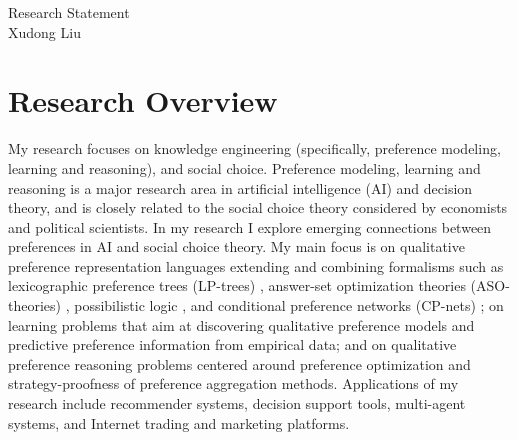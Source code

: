 \documentclass[11pt]{article}
\begin{document}
%

\begingroup  
  \centering
  \huge Research Statement\\[0.25em]
  \large Xudong Liu\par
\endgroup


\section{Research Overview}
\noindent My research focuses on knowledge engineering (specifically, 
preference modeling, learning and reasoning),
and social choice.
Preference modeling, learning and reasoning is a major research 
area in artificial intelligence (AI) and decision theory, and is closely related to the 
social choice theory considered by economists and political scientists. In my research I 
explore emerging connections between preferences in AI and social choice theory. 
My main focus is on qualitative preference representation languages extending and combining
formalisms such as  
lexicographic preference trees (LP-trees) \cite{booth:learningLP}, 
answer-set optimization theories (ASO-theories) \cite{Brewka:ASO}, 
possibilistic logic \cite{dubois1991towards}, and 
conditional preference networks (CP-nets) \cite{boutilier2004cp};
on learning problems that aim at discovering qualitative preference 
models and predictive preference information from empirical data; and on
qualitative preference reasoning problems centered around preference optimization 
and strategy-proofness of preference aggregation methods.
Applications of my research include recommender systems, decision support tools,
multi-agent systems, and Internet trading and marketing platforms.
\end{document}

